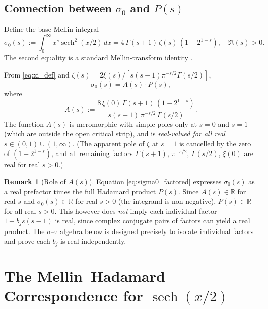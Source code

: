 \documentclass[12pt]{article}
\theoremstyle{plain}
\theoremstyle{definition}
\newtheorem{remark}[theorem]{Remark}
\DeclareMathOperator{\sech}{sech}
\newcommand{\R}{\mathbb{R}}
\begin{document}
\subsection{Connection between $\sigma_0$ and $P(s)$}

Define the base Mellin integral
\begin{equation}\label{eq:sigma0_def}
  \sigma_0(s) := \int_0^\infty x^s\sech^2(x/2)\,dx
  = 4\,\Gamma(s+1)\,\zeta(s)\,(1-2^{1-s}), \quad \Re(s)>0.
\end{equation}
The second equality is a standard Mellin-transform identity \cite{Titchmarsh1986}.

From \eqref{eq:xi_def} and $\zeta(s)=2\xi(s)/[s(s-1)\pi^{-s/2}\Gamma(s/2)]$,
\begin{equation}\label{eq:sigma0_factored}
  \sigma_0(s) = A(s)\cdot P(s),
\end{equation}
where
\begin{equation}\label{eq:A_def}
  A(s) := \frac{8\,\xi(0)\,\Gamma(s+1)\,(1-2^{1-s})}{s(s-1)\,\pi^{-s/2}\,\Gamma(s/2)}.
\end{equation}
The function $A(s)$ is meromorphic with simple poles only at $s=0$ and $s=1$
(which are outside the open critical strip), and is \emph{real-valued for all
real $s\in(0,1)\cup(1,\infty)$}.  (The apparent pole of $\zeta$ at $s=1$ is
cancelled by the zero of $(1-2^{1-s})$, and all remaining factors
$\Gamma(s+1)$, $\pi^{-s/2}$, $\Gamma(s/2)$, $\xi(0)$ are real for real $s>0$.)

\begin{remark}[Role of $A(s)$]
Equation \eqref{eq:sigma0_factored} expresses $\sigma_0(s)$ as a real prefactor
times the full Hadamard product $P(s)$.
Since $A(s)\in\R$ for real $s$ and $\sigma_0(s)\in\R$ for real $s>0$
(the integrand is non-negative), $P(s)\in\R$ for all real $s>0$.
This however does \emph{not} imply each individual factor $1+b_j s(s-1)$ is real,
since complex conjugate pairs of factors can yield a real product.
The $\sigma$--$\tau$ algebra below is designed precisely to isolate individual
factors and prove each $b_j$ is real independently.
\end{remark}


\section{The Mellin--Hadamard Correspondence for $\sech(x/2)$}
\label{sec:mellin_hadamard}
\end{document}
